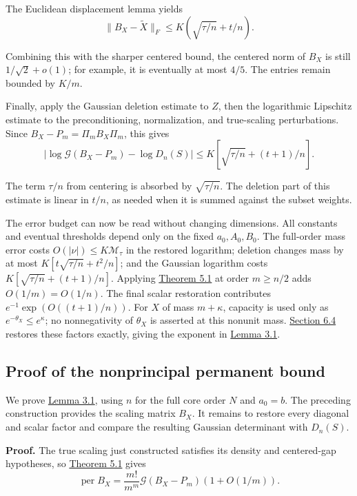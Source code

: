 \documentclass[11pt,a4paper]{article}
\newcommand{\paperref}[2]{\hyperref[#1]{#2}}
\begin{document}
The Euclidean displacement lemma yields
\[\|B_X-\widetilde X\|_F\le K(\sqrt{\tau/n}+t/n).\]

Combining this with the sharper centered bound, the centered norm of \(B_X\) is still \(1/\sqrt2+o(1)\); for example, it is eventually at most \(4/5\). The entries remain bounded by \(K/m\).

Finally, apply the Gaussian deletion estimate to \(Z\), then the logarithmic Lipschitz estimate to the preconditioning, normalization, and true-scaling perturbations. Since \(B_X-P_m=\Pi_mB_X\Pi_m\), this gives
\[|\log\mathcal G(B_X-P_m)-\log D_n(S)|\le K\left[\sqrt{\tau/n}+(t+1)/n\right].\]

The term \(\tau/n\) from centering is absorbed by \(\sqrt{\tau/n}\). The deletion part of this estimate is linear in \(t/n\), as needed when it is summed against the subset weights.

The error budget can now be read without changing dimensions. All constants and eventual thresholds depend only on the fixed \(a_0,A_0,B_0\). The full-order mass error costs \(O(|\nu|)\le K\mathcal M_\tau\) in the restored logarithm; deletion changes mass by at most \(K[t\sqrt{\tau/n}+t^2/n]\); and the Gaussian logarithm costs \(K[\sqrt{\tau/n}+(t+1)/n]\). Applying \paperref{thm-5.1}{Theorem 5.1} at order \(m\ge n/2\) adds \(O(1/m)=O(1/n)\). The final scalar restoration contributes \(e^{-1}\exp(O((t+1)/n))\). For \(X\) of mass \(m+\kappa\), capacity is used only as \(e^{-\theta_X}\le e^\kappa\); no nonnegativity of \(\theta_X\) is asserted at this nonunit mass. \paperref{sec-6.4}{Section 6.4} restores these factors exactly, giving the exponent in \paperref{thm-3.1}{Lemma 3.1}.

\subsection{Proof of the nonprincipal permanent bound}\label{sec-6.4}

We prove \paperref{thm-3.1}{Lemma 3.1}, using \(n\) for the full core order \(N\) and \(a_0=b\). The preceding construction provides the scaling matrix \(B_X\). It remains to restore every diagonal and scalar factor and compare the resulting Gaussian determinant with \(D_n(S)\).

\textbf{Proof.} The true scaling just constructed satisfies its density and centered-gap hypotheses, so \paperref{thm-5.1}{Theorem 5.1} gives
\[\operatorname{per}B_X=\frac{m!}{m^m}\mathcal G(B_X-P_m)(1+O(1/m)).\]
\end{document}
